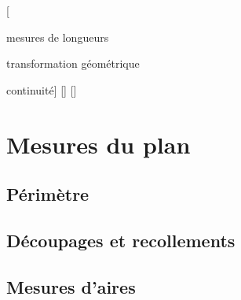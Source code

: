 \def\theme{Périmètres, aires, volumes}

\def\md{\ensuremath{\meter^2}}
\def\mt{\ensuremath{\meter^3}}
\def\Lt{\ensuremath{\liter}}

\def\Per{\ensuremath{\mathcal{P}}}
\def\A{\ensuremath{\mathcal{A}}}
\def\V{\ensuremath{\mathcal{V}}}
\def\B{\ensuremath{\mathcal{B}}}
\def\C{\ensuremath{\mathcal{C}}}

\def\u{\vect{u}}
\def\v{\vect{v}}

\def\cbmath{\href{https://docplayer.fr/210413521-Lecon-n-o-18-perimetres-aires-volumes-capes-session-cbmaths-cbmaths-fr-derniere-mise-a-jour-2-avril-2021.html}{CBMaths.fr}}
\def\jean{\href{https://www.mathenjeans.fr/sites/default/files/comptes-rendus/polygones_-_saint_dominique_nancy.pdf}{mathenjeans.fr}}

\newcommand{\drawArea}[1][blue]{\fill[fill = #1, opacity = 0.2]}



\hbox{}
[\item mesures de longueurs
\item transformation géométrique
\item continuité] %
[] %
[] %

\section{Mesures du plan}
\subsection{Périmètre}
\subsection{Découpages et recollements}
\subsection{Mesures d'aires}
